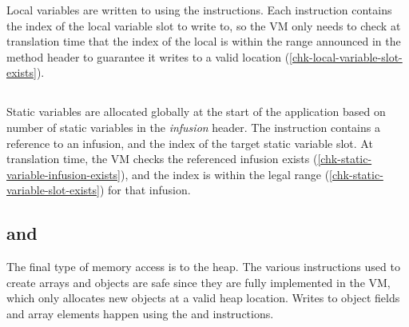 Local variables are written to using the  instructions. Each  instruction contains the index of the local variable slot to write to, so the VM only needs to check at translation time that the index of the local is within the range announced in the method header to guarantee it writes to a valid location (\ref{chk-local-variable-slot-exists}).

\subsection{}
Static variables are allocated globally at the start of the application based on number of static variables in the \emph{infusion} header. The  instruction contains a reference to an infusion, and the index of the target static variable slot. At translation time, the VM checks the referenced infusion exists (\ref{chk-static-variable-infusion-exists}), and the index is within the legal range (\ref{chk-static-variable-slot-exists}) for that infusion.

\subsection{ and }
\label{sec-safety-heap-access}




The final type of memory access is to the heap. The various  instructions used to create arrays and objects are safe since they are fully implemented in the VM, which only allocates new objects at a valid heap location. Writes to object fields and array elements happen using the  and  instructions.

